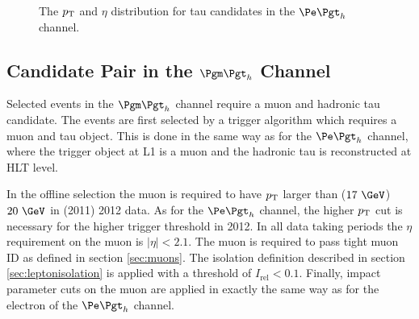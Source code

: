 \begin{figure}[htb]
\begin{center}

\end{center}
\caption{
The $p_{\mathrm{T}}$ and $\eta$ distribution for tau candidates in the $\etau$
channel.
}
\label{fig:etautaus}
\end{figure}

\subsection{Candidate Pair in the $\mutau$ Channel}

Selected events in the $\mutau$ channel require a muon and hadronic tau
candidate. The events are first selected by a trigger algorithm which requires
a muon and tau object. This is done in the same way as for the $\etau$ channel,
where the trigger object at \ac{L1} is a muon and the hadronic tau is
reconstructed at \ac{HLT} level.

In the offline selection the muon is required to have $p_{\mathrm{T}}$ larger than ($17~\GeV$)
$20~\GeV$ in (2011) 2012 data. As for the $\etau$ channel, the higher $p_{\mathrm{T}}$ cut is necessary for the
higher trigger threshold in 2012. In all data taking periods the $\eta$ requirement
on the muon is $|\eta| < 2.1$. The muon is required to pass tight muon ID as
defined in section \ref{sec:muons}. The isolation definition described in 
section \ref{sec:leptonisolation} is
applied with a threshold of $I_{\text{rel}} < 0.1$. Finally, impact parameter cuts on the muon are
applied in exactly the same way as for the electron of the $\etau$ channel.

